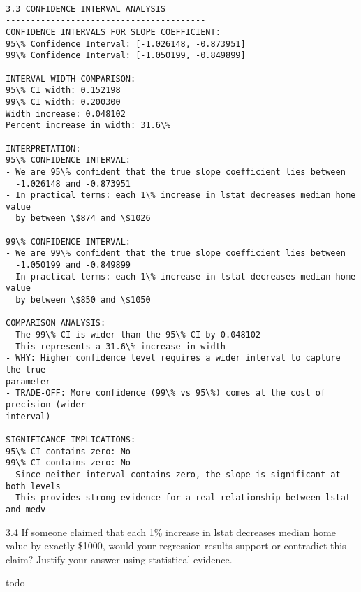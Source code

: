 \documentclass[11pt, twocolumn]{article}
\begin{document}
    \begin{Verbatim}[commandchars=\\\{\}]

3.3 CONFIDENCE INTERVAL ANALYSIS
----------------------------------------
CONFIDENCE INTERVALS FOR SLOPE COEFFICIENT:
95\% Confidence Interval: [-1.026148, -0.873951]
99\% Confidence Interval: [-1.050199, -0.849899]

INTERVAL WIDTH COMPARISON:
95\% CI width: 0.152198
99\% CI width: 0.200300
Width increase: 0.048102
Percent increase in width: 31.6\%

INTERPRETATION:
95\% CONFIDENCE INTERVAL:
- We are 95\% confident that the true slope coefficient lies between
  -1.026148 and -0.873951
- In practical terms: each 1\% increase in lstat decreases median home value
  by between \$874 and \$1026

99\% CONFIDENCE INTERVAL:
- We are 99\% confident that the true slope coefficient lies between
  -1.050199 and -0.849899
- In practical terms: each 1\% increase in lstat decreases median home value
  by between \$850 and \$1050

COMPARISON ANALYSIS:
- The 99\% CI is wider than the 95\% CI by 0.048102
- This represents a 31.6\% increase in width
- WHY: Higher confidence level requires a wider interval to capture the true
parameter
- TRADE-OFF: More confidence (99\% vs 95\%) comes at the cost of precision (wider
interval)

SIGNIFICANCE IMPLICATIONS:
95\% CI contains zero: No
99\% CI contains zero: No
- Since neither interval contains zero, the slope is significant at both levels
- This provides strong evidence for a real relationship between lstat and medv
    \end{Verbatim}

    3.4 If someone claimed that each 1\% increase in lstat decreases median
home value by exactly \$1000, would your regression results support or
contradict this claim? Justify your answer using statistical evidence.

todo
\end{document}
